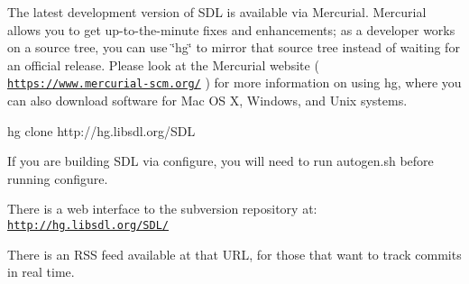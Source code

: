 The latest development version of S\+DL is available via Mercurial. Mercurial allows you to get up-\/to-\/the-\/minute fixes and enhancements; as a developer works on a source tree, you can use \char`\"{}hg\char`\"{} to mirror that source tree instead of waiting for an official release. Please look at the Mercurial website ( \href{https://www.mercurial-scm.org/}{\tt https\+://www.\+mercurial-\/scm.\+org/} ) for more information on using hg, where you can also download software for Mac OS X, Windows, and Unix systems. \begin{DoxyVerb}hg clone http://hg.libsdl.org/SDL
\end{DoxyVerb}


If you are building S\+DL via configure, you will need to run autogen.\+sh before running configure.

There is a web interface to the subversion repository at\+: \href{http://hg.libsdl.org/SDL/}{\tt http\+://hg.\+libsdl.\+org/\+S\+D\+L/}

There is an R\+SS feed available at that U\+RL, for those that want to track commits in real time. 